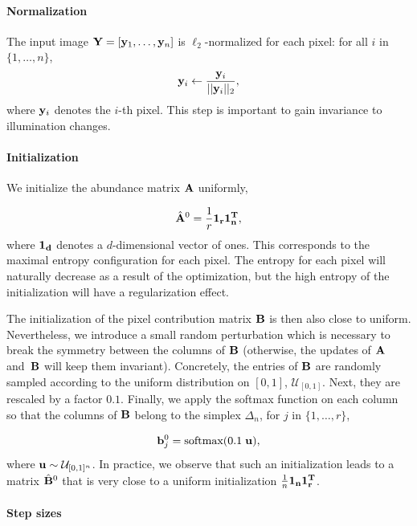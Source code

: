 \paragraph{Normalization}

The input image $\mathbf Y = [\mathbf y_1, \ldots, \mathbf y_n]$ is $\ell_2$-normalized for
each pixel: for all $i$ in $\{1, \ldots, n\}$,
\begin{equation} \label{eq:normalization}
  \mathbf y_i \gets \frac{\mathbf y_i}{||\mathbf y_i||_2},
\end{equation}
where $\mathbf y_i$ denotes the $i$-th pixel. 
This step is important to gain invariance to illumination changes.


\paragraph{Initialization}

We initialize the abundance matrix $\mathbf A$ uniformly,

\begin{equation}
  \label{eq:initA0}
  \hat{\mathbf A}^0 = \frac{1}{r} \bf 1_r \bf 1_n^T,
\end{equation}
where $\bf 1_d$ denotes a $d$-dimensional vector of ones.
This corresponds to the maximal entropy configuration for each pixel.
The entropy for each pixel will naturally decrease as a result of the optimization, but the high entropy of the initialization will have a regularization effect.

The initialization of the pixel contribution matrix $\mathbf B$ is then also close to uniform. 
Nevertheless, we introduce a small random perturbation which is necessary to break the symmetry between the columns of $\mathbf B$ (otherwise, the updates of $\mathbf A$ and~$\mathbf B$ will keep them invariant).
Concretely, the entries of $\mathbf B$ are randomly sampled according to the uniform distribution on $[0,1]$, $\mathcal{U}_{[0,1]}$.
Next, they are rescaled by a factor $0.1$.
Finally, we apply the softmax function on each column so that the columns of $\mathbf B$ belong to the simplex $\Delta_n$, for $j$ in $\{1, \ldots, r\}$,

\begin{equation}
  \label{eq:initB0}
  \mathbf b^0_j = \text{softmax}(0.1 \; \mathbf u),
\end{equation}
where $\mathbf u \sim \mathcal{U}_{[0,1]^n}$. In practice, we observe that such an initialization leads to 
a matrix $\hat{\mathbf B}^0$ that is very close to a uniform initialization $\frac{1}{n} \bf 1_n \bf 1_r^T$.

\paragraph{Step sizes}


